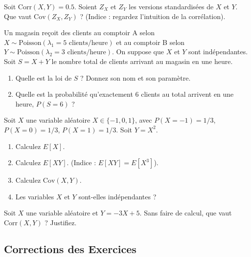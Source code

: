 \begin{exercicebox}
Soit $\text{Corr}(X,Y) = 0.5$. Soient $Z_X$ et $Z_Y$ les versions standardisées de $X$ et $Y$.
Que vaut $\text{Cov}(Z_X, Z_Y)$ ? (Indice : regardez l'intuition de la corrélation).
\end{exercicebox}

\begin{exercicebox}
Un magasin reçoit des clients au comptoir A selon $X \sim \text{Poisson}(\lambda_1=5 \text{ clients/heure})$ et au comptoir B selon $Y \sim \text{Poisson}(\lambda_2=3 \text{ clients/heure})$. On suppose que $X$ et $Y$ sont indépendantes.
Soit $S = X+Y$ le nombre total de clients arrivant au magasin en une heure.
\begin{enumerate}
    \item Quelle est la loi de $S$ ? Donnez son nom et son paramètre.
    \item Quelle est la probabilité qu'exactement 6 clients au total arrivent en une heure, $P(S=6)$ ?
\end{enumerate}
\end{exercicebox}

\begin{exercicebox}
Soit $X$ une variable aléatoire $X \in \{-1, 0, 1\}$, avec $P(X=-1)=1/3$, $P(X=0)=1/3$, $P(X=1)=1/3$.
Soit $Y = X^2$.
\begin{enumerate}
    \item Calculez $E[X]$.
    \item Calculez $E[XY]$. (Indice : $E[XY] = E[X^3]$).
    \item Calculez $\text{Cov}(X,Y)$.
    \item Les variables $X$ et $Y$ sont-elles indépendantes ?
\end{enumerate}
\end{exercicebox}

\begin{exercicebox}
Soit $X$ une variable aléatoire et $Y = -3X + 5$.
Sans faire de calcul, que vaut $\text{Corr}(X,Y)$ ? Justifiez.
\end{exercicebox}

\subsection{Corrections des Exercices}

